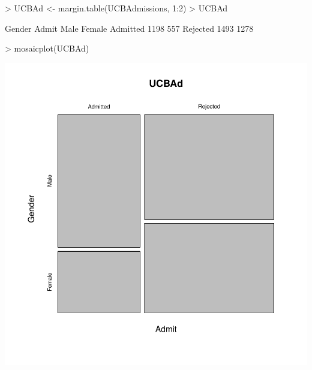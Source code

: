 \documentclass[12pt,letterpaper,final]{article}
\begin{document}
\begin{Schunk}
\begin{Sinput}
> UCBAd <- margin.table(UCBAdmissions, 1:2)
> UCBAd
\end{Sinput}
\begin{Soutput}
          Gender
Admit      Male Female
  Admitted 1198    557
  Rejected 1493   1278
\end{Soutput}
\begin{Sinput}
> mosaicplot(UCBAd)
\end{Sinput}
\end{Schunk}
\includegraphics{lect_main-039}
\end{document}

